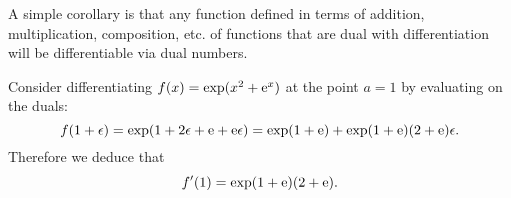 A simple corollary is that any function defined in terms of addition, multiplication, composition, etc. of functions that are dual with differentiation will be differentiable via dual numbers.

\begin{example}

Consider differentiating $f(x) =  \exp(x^2 + {\rm e}^x)$ at the point $a = 1$ by evaluating on the duals:
\[
f(1 + \epsilon) = \exp(1 + 2\epsilon + {\rm e} + {\rm e} \epsilon) =  \exp(1 + {\rm e}) + \exp(1 + {\rm e}) (2 + {\rm e}) \epsilon.
\]
Therefore we deduce that
\[
f'(1) = \exp(1 + {\rm e}) (2 + {\rm e}).
\]
\end{example}



